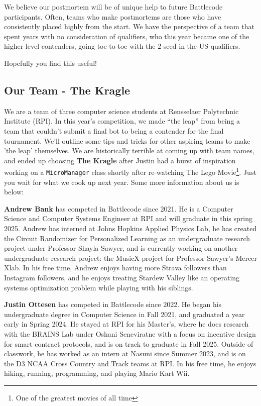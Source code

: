 We believe our postmortem will be of unique help to future Battlecode participants. Often, teams who make postmortems are those who have consistently placed highly from the start. We have the perspective of a team that spent years with no consideration of qualifiers, who this year became one of the higher level contenders, going toe-to-toe with the 2 seed in the US qualifiers.

\medskip

Hopefully you find this useful!

\subsection{Our Team - The Kragle}

We are a team of three computer science students at Rensselaer Polytechnic Institute (RPI). In this year's competition, we made ``the leap'' from being a team that couldn't submit a final bot to being a contender for the final tournament. We'll outline some tips and tricks for other aspiring teams to make 'the leap' themselves. We are historically terrible at coming up with team names, and ended up choosing \textbf{The Kragle} after Justin had a burst of inspiration working on a \verb|MicroManager| class shortly after re-watching The Lego Movie\footnote{One of the greatest movies of all time}. Just you wait for what we cook up next year. Some more information about us is below:

\medskip

\textbf{Andrew Bank} has competed in Battlecode since 2021. He is a Computer Science and Computer Systems Engineer at RPI and will graduate in this spring 2025. Andrew has interned at Johns Hopkins Applied Physics Lab, he has created the Circuit Randomizer for Personalized Learning as an undergraduate research project under Professor Shayla Sawyer, and is currently working on another undergraduate research project: the MusicX project for Professor Sawyer's Mercer Xlab. In his free time, Andrew enjoys having more Strava followers than Instagram followers, and he enjoys treating Stardew Valley like an operating systems optimization problem while playing with his siblings.

\medskip

\textbf{Justin Ottesen} has competed in Battlecode since 2022. He began his undergraduate degree in Computer Science in Fall 2021, and graduated a year early in Spring 2024. He stayed at RPI for his Master's, where he does research with the BRAINS Lab under Oshani Seneviratne with a focus on incentive design for smart contract protocols, and is on track to graduate in Fall 2025. Outside of classwork, he has worked as an intern at Nasuni since Summer 2023, and is on the D3 NCAA Cross Country and Track teams at RPI. In his free time, he enjoys hiking, running, programming, and playing Mario Kart Wii.

